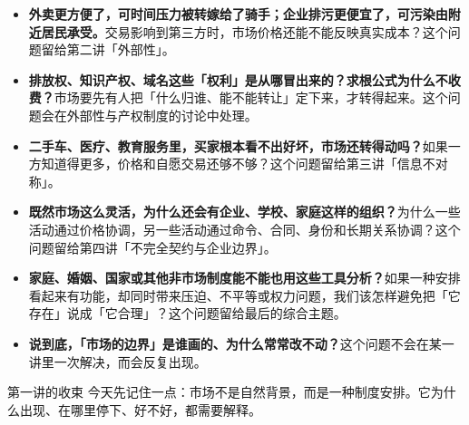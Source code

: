 \documentclass[10pt,a4paper]{ctexart}
\begin{document}
\begin{itemize}
  \item \textbf{外卖更方便了，可时间压力被转嫁给了骑手；企业排污更便宜了，可污染由附近居民承受。}交易影响到第三方时，市场价格还能不能反映真实成本？这个问题留给第二讲「外部性」。
  \item \textbf{排放权、知识产权、域名这些「权利」是从哪冒出来的？求根公式为什么不收费？}市场要先有人把「什么归谁、能不能转让」定下来，才转得起来。这个问题会在外部性与产权制度的讨论中处理。
  \item \textbf{二手车、医疗、教育服务里，买家根本看不出好坏，市场还转得动吗？}如果一方知道得更多，价格和自愿交易还够不够？这个问题留给第三讲「信息不对称」。
  \item \textbf{既然市场这么灵活，为什么还会有企业、学校、家庭这样的组织？}为什么一些活动通过价格协调，另一些活动通过命令、合同、身份和长期关系协调？这个问题留给第四讲「不完全契约与企业边界」。
  \item \textbf{家庭、婚姻、国家或其他非市场制度能不能也用这些工具分析？}如果一种安排看起来有功能，却同时带来压迫、不平等或权力问题，我们该怎样避免把「它存在」说成「它合理」？这个问题留给最后的综合主题。
  \item \textbf{说到底，「市场的边界」是谁画的、为什么常常改不动？}这个问题不会在某一讲里一次解决，而会反复出现。
\end{itemize}

\begin{insightbox}{第一讲的收束}
今天先记住一点：市场不是自然背景，而是一种制度安排。它为什么出现、在哪里停下、好不好，都需要解释。
\end{insightbox}
\end{document}
